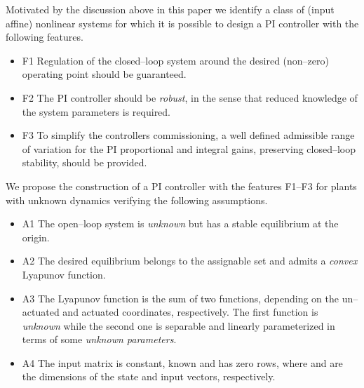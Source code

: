\documentclass[10pt, conference]{ieeeconf}
\def\begite{\begin{itemize}}
\def\endite{\end{itemize}}
\begin{document}
Motivated by the discussion above in this paper we identify a class of (input affine) nonlinear systems for which it is possible to design a PI controller with the following features.
\begite
\item[F1] Regulation of the closed--loop system around the desired (non--zero) operating point should be guaranteed.
\item[F2] The PI controller should be {\em robust}, in the sense that reduced knowledge of the system parameters is required.
\item[F3] To simplify the controllers commissioning, a well defined admissible range of variation for the PI proportional and integral gains, preserving closed--loop stability, should be provided.
\endite
We propose the construction of a PI controller with the features F1--F3 for plants with unknown dynamics verifying the following assumptions.
\begite
\item[A1] The open--loop system is {\em unknown} but has a stable equilibrium at the origin.
\item[A2] The desired equilibrium belongs to the assignable set and admits a {\em convex} Lyapunov function.
\item[A3] The Lyapunov function is the sum of two functions, depending on the un--actuated and actuated coordinates, respectively. The first function is {\em unknown} while the second one is separable and linearly parameterized in terms of some {\em unknown parameters}.
\item[A4] The input matrix is constant, known and has  zero rows, where  and  are the dimensions of the state  and  input vectors, respectively.
\endite
\end{document}
